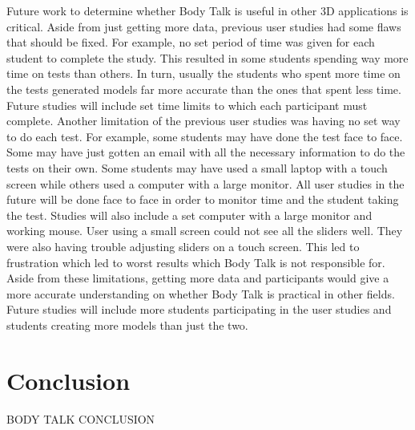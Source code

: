 \documentclass[journal]{vgtc}                %
\begin{document}
\noindent Future work to determine whether Body Talk is useful in other 3D applications is critical. Aside from just getting more data, 
previous user studies had some flaws that should be fixed. 
\newline \newline
\noindent For example, no set period of time was given for each student to complete the study. This resulted in some students spending 
way more time on tests than others. In turn, usually the students who spent more time on the tests generated models far more accurate 
than the ones that spent less time. Future studies will include set time limits to which each participant must complete. 
\newline\newline
\noindent Another limitation of the previous user studies was having no set way to do each test. For example, some students may have 
done the test face to face. Some may have just gotten an email with all the necessary information to do the tests on their own. Some 
students may have used a small laptop with a touch screen while others used a computer with a large monitor. All user studies in the 
future will be done face to face in order to monitor time and the student taking the test. Studies will also include a set computer with 
a large monitor and working mouse. User using a small screen could not see all the sliders well. They were also having trouble adjusting 
sliders on a touch screen. This led to frustration which led to worst results which Body Talk is not responsible for. 
\newline\newline
\noindent Aside from these limitations, getting more data and participants would give a more accurate understanding on whether Body Talk 
is practical in other fields. Future studies will include more students participating in the user studies and students creating more 
models than just the two.  
  




\section{Conclusion}

BODY TALK CONCLUSION 



%

%
%
%


\end{document}
